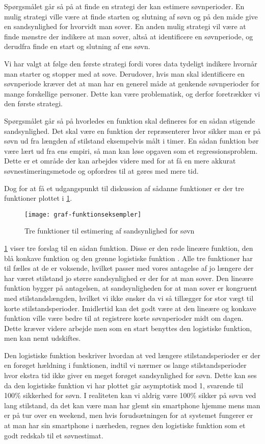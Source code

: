 Spørgsmålet går så på at finde en strategi der kan estimere søvnperioder. 
En mulig strategi ville være at finde starten og slutning af søvn og på den måde give en sandsynlighed for hvorvidt man sover.
En anden mulig strategi vil være at finde mønstre der indikere at man sover, altså at identificere en søvnperiode, og derudfra finde en start og slutning af ens søvn.

Vi har valgt at følge den første strategi fordi vores data tydeligt indikere hvornår man starter og stopper med at sove. 
Derudover, hvis man skal identificere en søvnperiode kræver det at man har en generel måde at genkende søvnperioder for mange forskellige personer.
Dette kan være problematisk, og derfor foretrækker vi den første strategi.

Spørgsmålet går så på hvorledes en funktion skal defineres for en sådan stigende sandsynlighed.
Det skal være en funktion der repræsenterer hvor sikker man er på søvn ud fra længden af stilstand eksempelvis målt i timer.
En sådan funktion bør være lært ud fra ens empiri, så man kan løse opgaven som et regressionsproblem.
Dette er et område der kan arbejdes videre med for at få en mere akkurat søvnestimeringsmetode og opfordres til at gøres med mere tid.

Dog for at få et udgangspunkt til diskussion af sådanne funktioner er der tre funktioner plottet i \cref{fig:trefunc}.
\begin{figure}[h]
	\centering
	\texttt{[image: graf-funktionseksempler]}
	\caption{Tre funktioner til estimering af sandsynlighed for søvn}\label{fig:trefunc}
\end{figure}

\cref{fig:trefunc} viser tre forslag til en sådan funktion.
Disse er den røde lineære funktion, den blå konkave funktion og den grønne logistiske funktion \citep{wiki:LogisticFunction}.
Alle tre funktioner har til fælles at de er voksende, hvilket passer med vores antagelse af jo længere der har været stilstand jo større sandsynlighed er der for at man sover.
Den lineære funktion bygger på antagelsen, at sandsynligheden for at man sover er kongruent med stilstandslængden, hvilket vi ikke ønsker da vi så tillægger for stor vægt til korte stilstandsperioder. Imidlertid kan det godt være at den lineære og konkave funktion ville være bedre til at registrere korte søvnperioder midt om dagen.
Dette kræver videre arbejde men som en start benyttes den logistiske funktion, men kan nemt udskiftes.


Den logistiske funktion beskriver hvordan at ved længere stilstandsperioder er der en forøget hældning i funktionen, indtil vi nærmer os lange stilstandsperioder hvor ekstra tid ikke giver en meget forøget sandsynlighed for søvn. 
Dette kan ses da den logistiske funktion vi har plottet går asymptotisk mod 1, svarende til 100\% sikkerhed for søvn.
I realiteten kan vi aldrig være 100\% sikker på søvn ved lang stilstand, da det kan være man har glemt sin smartphone hjemme mens man er på tur over en weekend, men hvis forudsætningen for at systemet fungerer er at man har sin smartphone i nærheden, regnes den logistiske funktion som et godt redskab til et søvnestimat.

